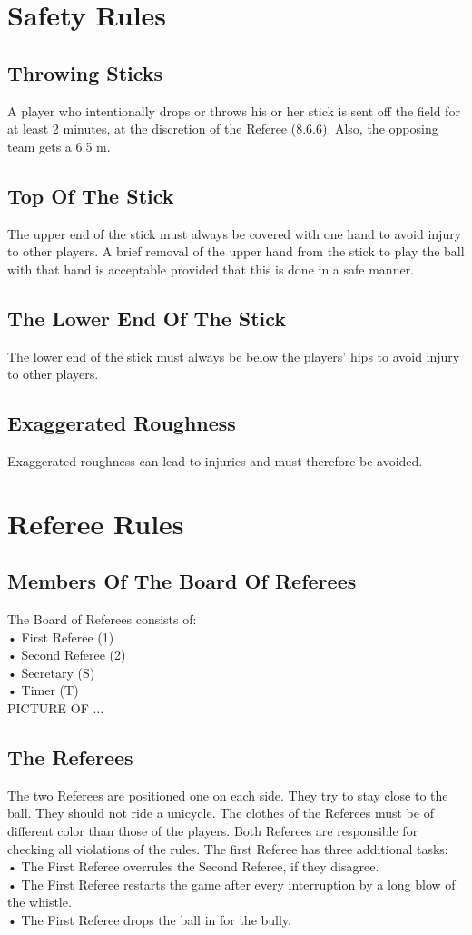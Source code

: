 \section{Safety Rules}
\subsection{Throwing Sticks}
A player who intentionally drops or throws his or her stick is sent off the field for at least 2 minutes, at the discretion of
the Referee (8.6.6). Also, the opposing team gets a 6.5 m.
\subsection{Top Of The Stick}
The upper end of the stick must always be covered with one hand to avoid injury to other players. A brief removal of
the upper hand from the stick to play the ball with that hand is acceptable provided that this is done in a safe manner.
\subsection{The Lower End Of The Stick}
The lower end of the stick must always be below the players’ hips to avoid injury to other players.
\subsection{Exaggerated Roughness}
Exaggerated roughness can lead to injuries and must therefore be avoided.
\section{Referee Rules}
 \subsection{Members Of The Board Of Referees}
 The Board of Referees consists of:\\
• First Referee (1)\\
• Second Referee (2)\\
• Secretary (S)\\
• Timer (T)\\
PICTURE OF ...
\subsection{The Referees}
The two Referees are positioned one on each side. They try to stay close to the ball. They should not ride a unicycle.
The clothes of the Referees must be of different color than those of the players. Both Referees are responsible for
checking all violations of the rules. The first Referee has three additional tasks:\\
• The First Referee overrules the Second Referee, if they disagree.\\
• The First Referee restarts the game after every interruption by a long blow of the whistle.\\
• The First Referee drops the ball in for the bully.

